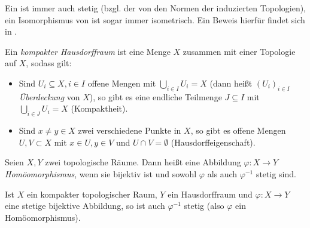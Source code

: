 \begin{bem}
Ein \CAlgHom{} ist immer auch stetig (bzgl. der von den Normen der \CAlgn{} induzierten Topologien), ein Isomorphismus von \CAlgn{} ist sogar immer isometrisch. Ein Beweis hierfür findet sich in  \cite[Korollare 2.1.19 \& 2.1.20]{Baer2003}.
\end{bem}


\begin{defn}
Ein \emph{kompakter Hausdorffraum} ist eine Menge $X$ zusammen mit einer Topologie auf $X$, sodass gilt:
\begin{itemize}
	\item Sind $U_i \subseteq X, i \in I$ offene Mengen mit $\bigcup_{i\in I} U_i = X$ (dann heißt $(U_i)_{i \in I}$ \emph{Überdeckung} von $X$), so gibt es eine endliche Teilmenge $J \subseteq I$ mit $\bigcup_{i\in J} U_i = X$ (Kompaktheit).
	\item Sind $x \neq y \in X$ zwei verschiedene Punkte in $X$, so gibt es offene Mengen $U,V \subset X$ mit $x \in U, y \in V$ und $U \cap V = \emptyset$ (Hausdorffeigenschaft).
\end{itemize}
\end{defn}

\begin{defn}[Homöomorphismus]
Seien $X, Y$ zwei topologische Räume. Dann heißt eine Abbildung $\varphi: X \to Y$ \emph{Homöomorphismus}, wenn sie bijektiv ist und sowohl $\varphi$ als auch $\varphi^{-1}$ stetig sind.
\end{defn}

\begin{lemma}\label{lemma:komHDHomoeo}
Ist $X$ ein kompakter topologischer Raum, $Y$ ein Hausdorffraum und $\varphi: X \to Y$ eine stetige bijektive Abbildung, so ist auch $\varphi^{-1}$ stetig (also $\varphi$ ein Homöomorphismus).
\end{lemma}

